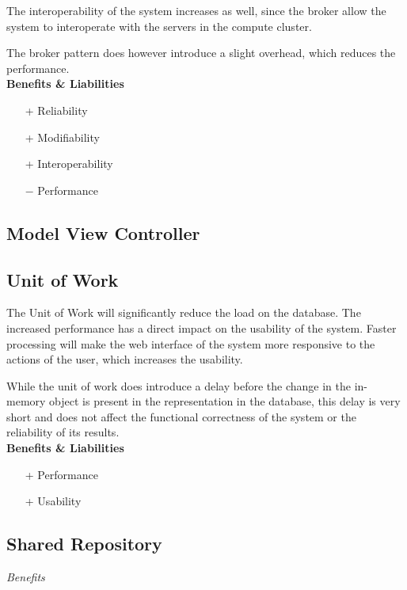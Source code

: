 The interoperability of the system increases as well, since the broker allow the system to interoperate with the servers in the compute cluster.

The broker pattern does however introduce a slight overhead, which reduces the performance.\\
\textbf{Benefits \& Liabilities} ~
\begin{itemize}
\item[+] Reliability
\item[+] Modifiability
\item[+] Interoperability
\item[$-$] Performance
\end{itemize}

\subsection*{Model View Controller}
\subsection*{Unit of Work}
The Unit of Work will significantly reduce the load on the database. The increased performance has a direct impact on the usability of the system. Faster processing will make the web interface of the system more responsive to the actions of the user, which increases the usability.

While the unit of work does introduce a delay before the change in the in-memory object is present in the representation in the database, this delay is very short and does not affect the functional correctness of the system or the reliability of its results.\\
\textbf{Benefits \& Liabilities} ~
\begin{itemize}
\item[+] Performance 
\item[+] Usability
\end{itemize}


\subsection*{Shared Repository} 

\textit{Benefits} \\

